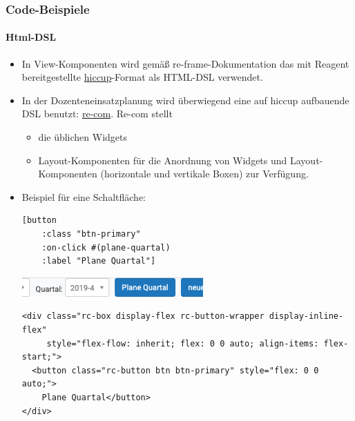 \documentclass[a4paper]{article}
\begin{document}
\subsubsection*{Code-Beispiele}
\label{sec:org302e5b4}
\paragraph*{Html-DSL}
\label{sec:orgb4b78a9}
\begin{itemize}
\item In View-Komponenten wird gemäß re-frame-Dokumentation das mit
Reagent bereitgestellte \href{https://github.com/weavejester/hiccup}{hiccup}-Format als HTML-DSL verwendet.
\item In der Dozenteneinsatzplanung wird überwiegend eine auf hiccup
aufbauende DSL benutzt: \href{https://github.com/day8/re-com}{re-com}. Re-com stellt
\begin{itemize}
\item die üblichen Widgets
\item Layout-Komponenten für die Anordnung von Widgets und
Layout-Komponenten (horizontale und vertikale Boxen) zur
Verfügung.
\end{itemize}
\item Beispiel für eine Schaltfläche:
\begin{nebeneinander}
\begin{verbatim}
[button
    :class "btn-primary"
    :on-click #(plane-quartal)
    :label "Plane Quartal"]
\end{verbatim}
\end{nebeneinander}
\begin{nebeneinander}
\begin{center}
\includegraphics[width=.9\linewidth]{./Abbildungen/planebutton.png}
\end{center}
\begin{verbatim}
<div class="rc-box display-flex rc-button-wrapper display-inline-flex" 
     style="flex-flow: inherit; flex: 0 0 auto; align-items: flex-start;">
  <button class="rc-button btn btn-primary" style="flex: 0 0 auto;">
    Plane Quartal</button>
</div>
\end{verbatim}
\end{nebeneinander}
\end{itemize}
\begin{clear}
\end{clear}
\end{document}
